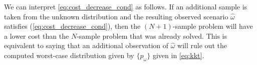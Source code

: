 \documentclass[11pt]{article}
\newtheorem{proposition}[theorem]{Proposition}
\begin{document}
We can interpret \eqref{eq:cost_decrease_cond} as follows. If an additional sample is taken from the unknown distribution and the resulting observed scenario $\hat{\omega}$ satisfies (\ref{eq:cost_decrease_cond}), then the $(N+1)$-sample problem will have a lower cost than the $N$-sample problem that was already solved.
This is equivalent to saying that an additional observation of $\hat{\omega}$ will rule out the computed worst-case distribution given by $\{p_\omega\}$ given in \eqref{eq:kkt}.

% 
% 
\end{document}
